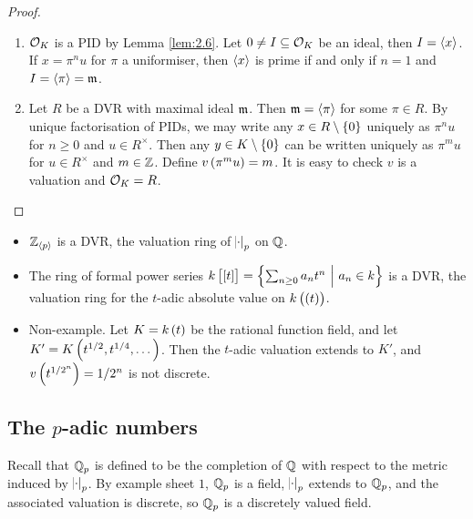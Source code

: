 \begin{proof}
\hfill
\begin{enumerate}
\item $ \mathcal{O}_K $ is a PID by Lemma \ref{lem:2.6}. Let $ 0 \ne I \subseteq \mathcal{O}_K $ be an ideal, then $ I = \left\langle x \right\rangle $. If $ x = \pi^nu $ for $ \pi $ a uniformiser, then $ \left\langle x \right\rangle $ is prime if and only if $ n = 1 $ and $ I = \left\langle \pi \right\rangle = \mathfrak{m} $.
\item Let $ R $ be a DVR with maximal ideal $ \mathfrak{m} $. Then $ \mathfrak{m} = \left\langle \pi \right\rangle $ for some $ \pi \in R $. By unique factorisation of PIDs, we may write any $ x \in R \setminus \cbr{0} $ uniquely as $ \pi^nu $ for $ n \ge 0 $ and $ u \in R^\times $. Then any $ y \in K \setminus \cbr{0} $ can be written uniquely as $ \pi^mu $ for $ u \in R^\times $ and $ m \in \mathbb{Z} $. Define $ v\br{\pi^mu} = m $. It is easy to check $ v $ is a valuation and $ \mathcal{O}_K = R $.
\end{enumerate}
\end{proof}

\begin{example*}
\hfill
\begin{itemize}
\item $ \mathbb{Z}_{\left\langle p \right\rangle} $ is a DVR, the valuation ring of $ \abs{\cdot}_p $ on $ \mathbb{Q} $.
\item The ring of formal power series $ k\sbr{\sbr{t}} = \cbr{\sum_{n \ge 0} a_nt^n \st a_n \in k} $ is a DVR, the valuation ring for the $ t $-adic absolute value on $ k\br{\br{t}} $.
\item Non-example. Let $ K = k\br{t} $ be the rational function field, and let $ K' = K\br{t^{1 / 2}, t^{1 / 4}, \dots} $. Then the $ t $-adic valuation extends to $ K' $, and $ v\br{t^{1 / 2^n}} = 1 / 2^n $ is not discrete.
\end{itemize}
\end{example*}

\pagebreak

\subsection{The \texorpdfstring{$ p $}{p}-adic numbers}


Recall that $ \mathbb{Q}_p $ is defined to be the completion of $ \mathbb{Q} $ with respect to the metric induced by $ \abs{\cdot}_p $. By example sheet $ 1 $, $ \mathbb{Q}_p $ is a field, $ \abs{\cdot}_p $ extends to $ \mathbb{Q}_p $, and the associated valuation is discrete, so $ \mathbb{Q}_p $ is a discretely valued field.

